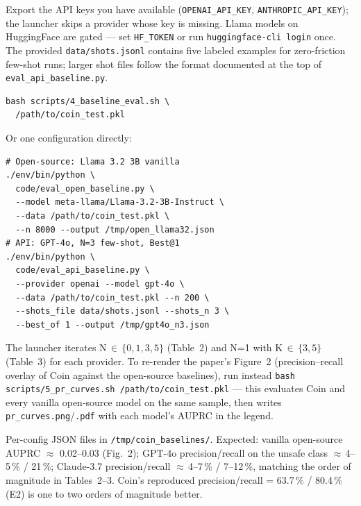 \documentclass[nonacm,sigconf]{acmart}
\begin{document}
\begin{compactitem}
  \begin{asparadesc}
  \item[Preparation:] Export the API keys you have available
        (\texttt{OPENAI\_API\_KEY}, \texttt{ANTHROPIC\_API\_KEY}); the
        launcher skips a provider whose key is missing. Llama models
        on HuggingFace are gated --- set \texttt{HF\_TOKEN} or run
        \texttt{huggingface-cli login} once. The provided
        \texttt{data/shots.jsonl} contains five labeled examples for
        zero-friction few-shot runs; larger shot files follow the
        format documented at the top of \texttt{eval\_api\_baseline.py}.
  \item[Execution:]
\begin{verbatim}
bash scripts/4_baseline_eval.sh \
  /path/to/coin_test.pkl
\end{verbatim}
        Or one configuration directly:
\begin{verbatim}
# Open-source: Llama 3.2 3B vanilla
./env/bin/python \
  code/eval_open_baseline.py \
  --model meta-llama/Llama-3.2-3B-Instruct \
  --data /path/to/coin_test.pkl \
  --n 8000 --output /tmp/open_llama32.json
# API: GPT-4o, N=3 few-shot, Best@1
./env/bin/python \
  code/eval_api_baseline.py \
  --provider openai --model gpt-4o \
  --data /path/to/coin_test.pkl --n 200 \
  --shots_file data/shots.jsonl --shots_n 3 \
  --best_of 1 --output /tmp/gpt4o_n3.json
\end{verbatim}
        The launcher iterates N\,$\in\,\{0,1,3,5\}$ (Table~2) and N=1
        with K\,$\in\,\{3,5\}$ (Table~3) for each provider.
        To re-render the paper's Figure~2 (precision--recall overlay of
        Coin against the open-source baselines), run instead
        \texttt{bash scripts/5\_pr\_curves.sh /path/to/coin\_test.pkl} ---
        this evaluates Coin and every vanilla open-source model on the
        same sample, then writes \texttt{pr\_curves.png}/\texttt{.pdf}
        with each model's AUPRC in the legend.
  \item[Results:] Per-config JSON files in \texttt{/tmp/coin\_baselines/}.
        Expected: vanilla open-source AUPRC $\approx$ 0.02--0.03
        (Fig.~2); GPT-4o precision/recall on the unsafe class
        $\approx$\,4--5\,\% / 21\,\%; Claude-3.7 precision/recall
        $\approx$\,4--7\,\% / 7--12\,\%, matching the order of
        magnitude in Tables~2--3. Coin's reproduced
        precision/recall = 63.7\,\% / 80.4\,\% (E2) is one to two
        orders of magnitude better.
  \end{asparadesc}

\end{compactitem}
\end{document}
